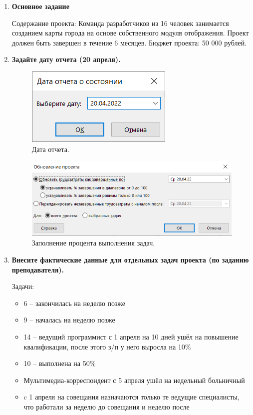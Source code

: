 \documentclass[a4paper,14pt]{extreport} %
\begin{document}
\begin{enumerate}

\item \textbf{Основное задание}

Содержание проекта: Команда разработчиков из 16 человек занимается созданием карты города на основе собственного модуля отображения. Проект должен быть завершен в течение 6 месяцев. Бюджет проекта: 50 000 рублей.

\item \textbf{Задайте дату отчета (20 апреля).}

\begin{figure}[H]
  \centering
  \caption{Дата отчета. }
  \includegraphics[scale=1.5]{1}
\end{figure}

\begin{figure}[H]
	\centering
	\caption{Заполнение процента выполнения задач. }
	\includegraphics[scale=1.1]{100}
\end{figure}
\item \textbf{Внесите фактические данные для отдельных задач проекта (по заданию преподавателя).}

Задачи:
\begin{itemize}
	\item 6 -- закончилась на неделю позже 
	\item 9 -- началась на неделю позже
	\item 14 -- ведущий программист с 1 апреля на 10 дней ушёл на повышение квалификации, после этого з/п у него выросла на 10\%
	\item 10 -- выполнена на 50\%
	\item Мультимедиа-корреспондент с 5 апреля ушёл на недельный больничный
	\item c 1 апреля на совещания назначаются только те ведущие специалисты, что работали за неделю до совещания и неделю после
\end{itemize}


\end{enumerate}
\end{document}
